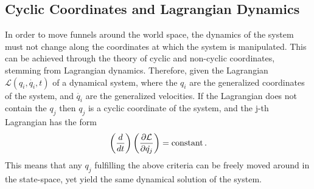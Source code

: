 \subsection{Cyclic Coordinates and Lagrangian Dynamics}
\label{subsec:cyclic-coordinates}

In order to move funnels around the world space, the dynamics of the system must
not change along the coordinates at which the system is manipulated. This can be
achieved through the theory of cyclic and non-cyclic coordinates, stemming from
Lagrangian dynamics. Therefore, given the Lagrangian \(\mathcal{L}(q_i,
\dot{q_i}, t)\) of a dynamical system, where the \(q_i\) are the generalized
coordinates of the system, and \(\dot{q_i}\) are the generalized velocities. If
the Lagrangian does not contain the \(q_j\) then \(q_j\) is a cyclic coordinate
of the system, and the j-th Lagrangian has the form
\[
  \left( \frac{d}{dt} \right) \left( \frac{\partial \mathcal{L}}{\partial
      \dot{q_j}} \right) = \mathrm{constant} \, .
\]
This means that any \(q_j\) fulfilling the above criteria can be freely moved
around in the state-space, yet yield the same dynamical solution of the system.
